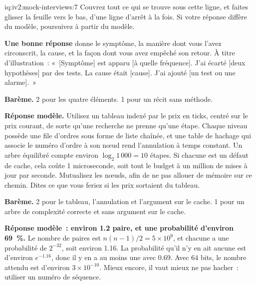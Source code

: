 \begin{solution}{iq:iv2:mock-interviews:7}
Couvrez tout ce qui se trouve sous cette ligne, et faites glisser la feuille vers le bas, d'une ligne d'arrêt à la fois. Si votre réponse diffère du modèle, poursuivez à partir du modèle.

\ivstop
\textbf{Une bonne réponse} donne le symptôme, la manière dont vous l'avez circonscrit, la cause, et la façon dont vous avez empêché son retour. À titre d'illustration~: «~[Symptôme] est apparu [à quelle fréquence]. J'ai écarté [deux hypothèses] par des tests. La cause était [cause]. J'ai ajouté [un test ou une alarme].~»

\textbf{Barème.} 2 pour les quatre éléments. 1 pour un récit sans méthode.

\ivstop
\textbf{Réponse modèle.} Utilisez un tableau indexé par le prix en ticks, centré sur le prix courant, de sorte qu'une recherche ne prenne qu'une étape. Chaque niveau possède une file d'ordres sous forme de liste chaînée, et une table de hachage qui associe le numéro d'ordre à son nœud rend l'annulation à temps constant. Un arbre équilibré compte environ $\log_2 1\,000 = 10$ étapes. Si chacune est un défaut de cache, cela coûte 1 microseconde, soit tout le budget à un million de mises à jour par seconde. Mutualisez les nœuds, afin de ne pas allouer de mémoire sur ce chemin. Dites ce que vous feriez si les prix sortaient du tableau.

\textbf{Barème.} 2 pour le tableau, l'annulation et l'argument sur le cache. 1 pour un arbre de complexité correcte et sans argument sur le cache.

\ivstop
\textbf{Réponse modèle~: environ 1.2 paire, et une probabilité d'environ 69~\%.} Le nombre de paires est $n(n - 1)/2 = 5 \times 10^9$, et chacune a une probabilité de $2^{-32}$, soit environ 1.16. La probabilité qu'il n'y en ait aucune est d'environ $e^{-1.16}$, donc il y en a au moins une avec $0.69$. Avec 64 bits, le nombre attendu est d'environ $3 \times 10^{-10}$. Mieux encore, il vaut mieux ne pas hacher~: utiliser un numéro de séquence.


\end{solution}
